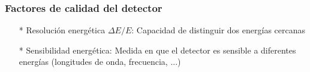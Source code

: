 \documentclass{beamer}
\begin{document}
\begin{frame}
				\frametitle{Factores de calidad del detector}
								\begin{itemize}
												\item[*] \alert{Resolución energética $\Delta E/E$:}
																Capacidad de distinguir dos energías cercanas
																\begin{center}
																\end{center}
																\pause
												\item[*] \alert{Sensibilidad energética:}
																Medida en que el detector es sensible a
																diferentes energías (longitudes de onda,
																frecuencia, ...)
																\begin{center}
																\end{center}
																\pause

\end{itemize}
\end{frame}
\end{document}

